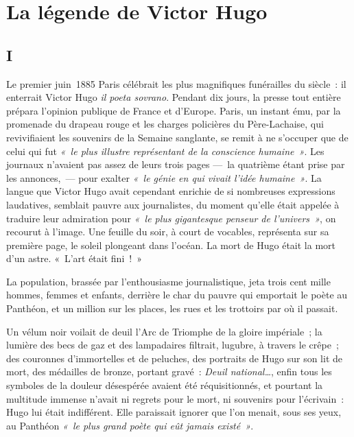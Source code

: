 \documentclass[french,twoside]{book} %
\newcommand{\dateline}[1]{\medskip{\RaggedLeft{#1}\par}\bigskip}
\newcommand{\signed}[1]{\bigbreak\filbreak{\raggedleft #1\par}\medskip}
\begin{document}
\signed{P. L.}

\dateline{Sainte Pélagie, 23 juin 1885.}
\section[{La légende de Victor Hugo}]{La légende de Victor Hugo\protect\footnotemark }\renewcommand{\leftmark}{La légende de Victor Hugo}

\label{p3}\subsection[{I}]{I}
\noindent Le premier juin 1885 Paris célébrait les plus magnifiques funérailles du siècle : il enterrait Victor Hugo {\itshape il poeta sovrano}. Pendant dix jours, la presse tout entière prépara l’opinion publique de France et d’Europe. Paris, un instant ému, par la promenade du drapeau rouge et les charges policières du Père-Lachaise, qui revivifiaient les souvenirs de la Semaine sanglante, se remit à ne s’occuper que de celui qui fut \emph{« le plus illustre représentant de la conscience humaine »}. Les journaux n’avaient pas assez de leurs trois pages — la quatrième étant prise par les annonces, — pour exalter \emph{« le génie en qui vivait l’idée humaine »}. La langue que Victor Hugo avait cependant enrichie de si nombreuses expressions laudatives, semblait pauvre aux journalistes, du moment qu’elle était appelée à traduire leur  
\label{p4}admiration pour \emph{« le plus gigantesque penseur de l’univers »}, on recourut à l’image. Une feuille du soir, à court de vocables, représenta sur sa première page, le soleil plongeant dans l’océan. La mort de Hugo était la mort d’un astre. « L’art était fini ! »\par
La population, brassée par l’enthousiasme journalistique, jeta trois cent mille hommes, femmes et enfants, derrière le char du pauvre qui emportait le poète au Panthéon, et un million sur les places, les rues et les trottoirs par où il passait.\par
Un vélum noir voilait de deuil l’Arc de Triomphe de la gloire impériale ; la lumière des becs de gaz et des lampadaires filtrait, lugubre, à travers le crêpe ; des couronnes d’immortelles et de peluches, des portraits de Hugo sur son lit de mort, des médailles de bronze, portant gravé : {\itshape Deuil national…}, enfin tous les symboles de la douleur désespérée avaient été réquisitionnés, et pourtant la multitude immense n’avait ni regrets pour le mort, ni souvenirs pour l’écrivain : Hugo lui était indifférent. Elle paraissait ignorer que l’on menait, sous ses yeux, au Panthéon \emph{« le plus grand poète qui eût jamais existé »}.\par
\end{document}
